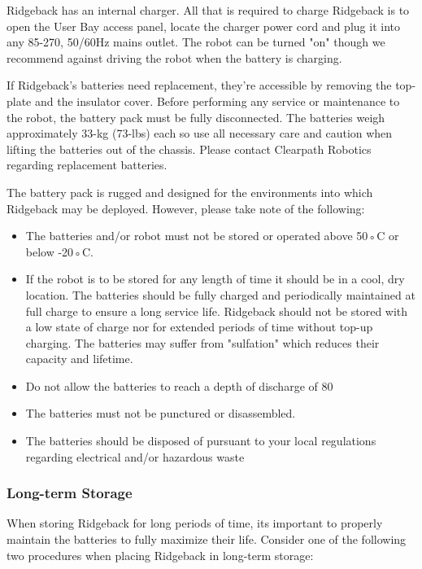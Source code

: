\documentclass[]{clearpath-latex/clearpath-manual}
\begin{document}
Ridgeback has an internal charger. All that is required to charge Ridgeback is to open the User Bay access panel, locate the charger power cord and plug it into any 85-270, 50/60Hz mains outlet. The robot can be turned "on" though we recommend against driving the robot when the battery is charging.

If Ridgeback's batteries need replacement, they're accessible by removing the top-plate and the insulator cover. Before performing any service or maintenance to the robot, the battery pack must be fully disconnected. The batteries weigh approximately 33-kg (73-lbs) each so use all necessary care and caution when lifting the batteries out of the chassis. Please contact Clearpath Robotics regarding replacement batteries.

The battery pack is rugged and designed for the environments into which Ridgeback may be deployed. However, please take note of the following:

\begin{itemize}[nolistsep]
	\item The batteries and/or robot must not be stored or operated above 50◦C or below -20◦C.
	\item If the robot is to be stored for any length of time it should be in a cool, dry location. The batteries should be fully charged and periodically maintained at full charge to ensure a long service life. Ridgeback should not be stored with a low state of charge nor for extended periods of time without top-up charging. The batteries may suffer from "sulfation" which reduces their capacity and lifetime.
	\item Do not allow the batteries to reach a depth of discharge of 80%
	\item The batteries must not be punctured or disassembled.
	\item The batteries should be disposed of pursuant to your local regulations regarding electrical and/or hazardous waste
\end{itemize}

\subsubsection{Long-term Storage}

When storing Ridgeback for long periods of time, its important to properly maintain the batteries to fully maximize their life.  Consider one of the following two procedures when placing Ridgeback in long-term storage:
\end{document}
